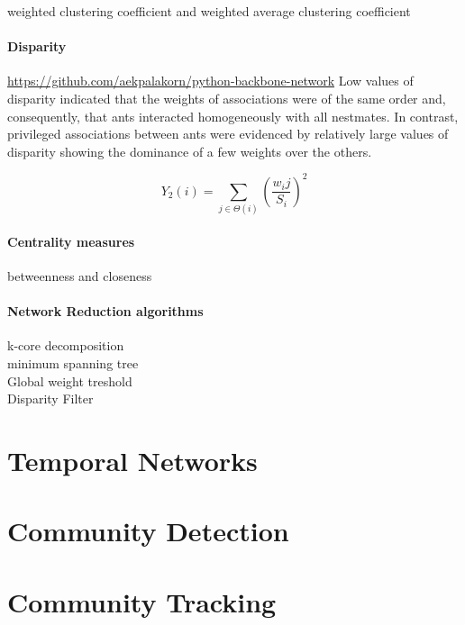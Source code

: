 weighted clustering coefficient and weighted average clustering coefficient~\cite{saramaki2007generalizations}\\

\paragraph*{Disparity}
\url{https://github.com/aekpalakorn/python-backbone-network}
Low values of disparity indicated that the weights of associations were of the same order and, consequently, that ants interacted homogeneously with all nestmates. In contrast, privileged associations between ants were evidenced by relatively large values of disparity showing the dominance of a few weights over the others.~\cite{barthelemy2005characterization}

$$Y_2(i)=\sum_{j\in \Theta(i)} (\frac{w_ij}{S_i})^2$$

\paragraph*{Centrality measures}
betweenness and closeness

\paragraph{Network Reduction algorithms}
k-core decomposition\\
minimum spanning tree\\
Global weight treshold\\
Disparity Filter\\

\section{Temporal Networks}

\section{Community Detection}

\section{Community Tracking}